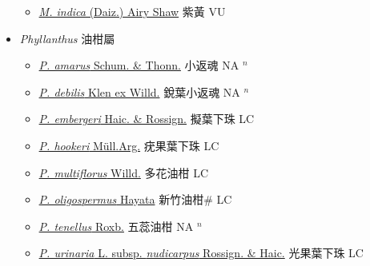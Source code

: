 \begin{itemize}
  \begin{itemize}
        \item[] \href{http://www.theplantlist.org/tpl1.1/search?q=Margaritaria+indica}{\textit{M. indica} (Daiz.) Airy Shaw}   紫黃 VU
  \end{itemize}
 \item[] \textit{Phyllanthus} 油柑屬
                    
  \begin{itemize}
        \item[] \href{http://www.theplantlist.org/tpl1.1/search?q=Phyllanthus+amarus}{\textit{P. amarus} Schum. \& Thonn.}   小返魂 NA $^n$
        \item[] \href{http://www.theplantlist.org/tpl1.1/search?q=Phyllanthus+debilis}{\textit{P. debilis} Klen ex Willd.}   銳葉小返魂 NA $^n$
        \item[] \href{http://www.theplantlist.org/tpl1.1/search?q=Phyllanthus+embergeri}{\textit{P. embergeri} Haic. \& Rossign.}   擬葉下珠 LC
        \item[] \href{http://www.theplantlist.org/tpl1.1/search?q=Phyllanthus+hookeri}{\textit{P. hookeri} Müll.Arg.}   疣果葉下珠 LC
        \item[] \href{http://www.theplantlist.org/tpl1.1/search?q=Phyllanthus+multiflorus}{\textit{P. multiflorus} Willd.}   多花油柑 LC
        \item[] \href{http://www.theplantlist.org/tpl1.1/search?q=Phyllanthus+oligospermus}{\textit{P. oligospermus} Hayata}   新竹油柑\# LC
        \item[] \href{http://www.theplantlist.org/tpl1.1/search?q=Phyllanthus+tenellus}{\textit{P. tenellus} Roxb.}   五蕊油柑 NA $^n$
        \item[] \href{http://www.theplantlist.org/tpl1.1/search?q=Phyllanthus+urinaria+subsp.+nudicarpus}{\textit{P. urinaria} L. subsp. \textit{nudicarpus} Rossign. \& Haic.}   光果葉下珠 LC

\end{itemize}
\end{itemize}
